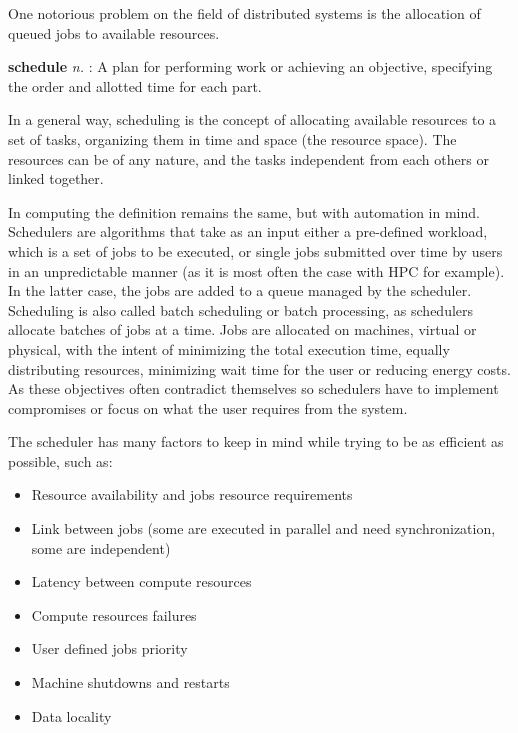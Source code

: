 
One notorious problem on the field of distributed systems is the allocation of
queued jobs to available resources.

\begin{displayquote}[][]
	\textbf{schedule} \textit{n.} : A plan for
	performing work or achieving an objective, specifying the order and
	allotted time for each part.
\end{displayquote}

In a general way, scheduling is the concept of allocating available resources
to a set of tasks, organizing them in time and space (the resource space). The
resources can be of any nature, and the tasks independent from each others or
linked together.

In computing the definition remains the same, but with automation in mind.
Schedulers are algorithms that take as an input either a pre-defined workload,
which is a set of jobs  to be executed, or single jobs submitted over time by
users in an unpredictable manner (as it is most often the case with HPC for
example). In the latter case, the jobs are added to a queue managed by the
scheduler. Scheduling is also called batch scheduling or batch processing, as
schedulers allocate batches of jobs at a time. Jobs are allocated on machines,
virtual or physical, with the intent of minimizing the total execution time,
equally distributing resources, minimizing wait time for the user or reducing
energy costs. As these objectives often contradict themselves so schedulers have
to implement compromises or focus on what the user requires from the system.

The scheduler has many factors to keep in mind while trying to be as efficient
as possible, such as:

\begin{itemize}
	\item Resource availability and jobs resource requirements
	\item Link between jobs (some are executed in parallel and need synchronization, some are independent)
	\item Latency between compute resources
	\item Compute resources failures
	\item User defined jobs priority
	\item Machine shutdowns and restarts
	\item Data locality
\end{itemize}

